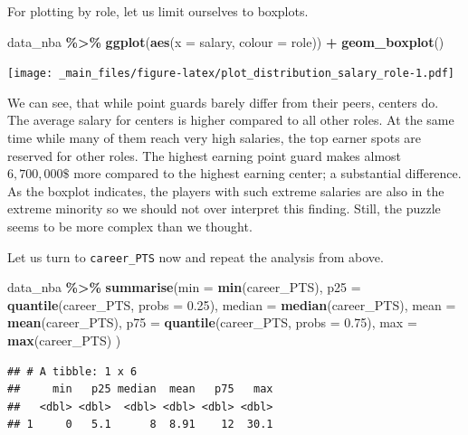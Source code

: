 \documentclass[
]{book}
\newenvironment{Shaded}{\begin{snugshade}}{\end{snugshade}}
\newcommand{\AttributeTok}[1]{\textcolor[rgb]{0.13,0.29,0.53}{#1}}
\newcommand{\FloatTok}[1]{\textcolor[rgb]{0.00,0.00,0.81}{#1}}
\newcommand{\FunctionTok}[1]{\textcolor[rgb]{0.13,0.29,0.53}{\textbf{#1}}}
\newcommand{\NormalTok}[1]{#1}
\newcommand{\SpecialCharTok}[1]{\textcolor[rgb]{0.81,0.36,0.00}{\textbf{#1}}}
\begin{document}
For plotting by role, let us limit ourselves to boxplots.

\begin{Shaded}
\begin{Highlighting}[]
\NormalTok{data\_nba }\SpecialCharTok{\%\textgreater{}\%}
  \FunctionTok{ggplot}\NormalTok{(}\FunctionTok{aes}\NormalTok{(}\AttributeTok{x =}\NormalTok{ salary, }\AttributeTok{colour =}\NormalTok{ role)) }\SpecialCharTok{+}
  \FunctionTok{geom\_boxplot}\NormalTok{()}
\end{Highlighting}
\end{Shaded}

\texttt{[image: \_main\_files/figure-latex/plot\_distribution\_salary\_role-1.pdf]}

We can see, that while point guards barely differ from their peers, centers do. The average salary for centers is higher compared to all other roles. At the same time while many of them reach very high salaries, the top earner spots are reserved for other roles. The highest earning point guard makes almost \(6,700,000\$\) more compared to the highest earning center; a substantial difference. As the boxplot indicates, the players with such extreme salaries are also in the extreme minority so we should not over interpret this finding. Still, the puzzle seems to be more complex than we thought.

Let us turn to \texttt{career\_PTS} now and repeat the analysis from above.

\begin{Shaded}
\begin{Highlighting}[]
\NormalTok{data\_nba }\SpecialCharTok{\%\textgreater{}\%} 
  \FunctionTok{summarise}\NormalTok{(}\AttributeTok{min =} \FunctionTok{min}\NormalTok{(career\_PTS),}
            \AttributeTok{p25 =} \FunctionTok{quantile}\NormalTok{(career\_PTS, }\AttributeTok{probs =} \FloatTok{0.25}\NormalTok{),}
            \AttributeTok{median =} \FunctionTok{median}\NormalTok{(career\_PTS),}
            \AttributeTok{mean =} \FunctionTok{mean}\NormalTok{(career\_PTS),}
            \AttributeTok{p75 =} \FunctionTok{quantile}\NormalTok{(career\_PTS, }\AttributeTok{probs =} \FloatTok{0.75}\NormalTok{),}
            \AttributeTok{max =} \FunctionTok{max}\NormalTok{(career\_PTS)}
\NormalTok{            )}
\end{Highlighting}
\end{Shaded}

\begin{verbatim}
## # A tibble: 1 x 6
##     min   p25 median  mean   p75   max
##   <dbl> <dbl>  <dbl> <dbl> <dbl> <dbl>
## 1     0   5.1      8  8.91    12  30.1
\end{verbatim}
\end{document}
